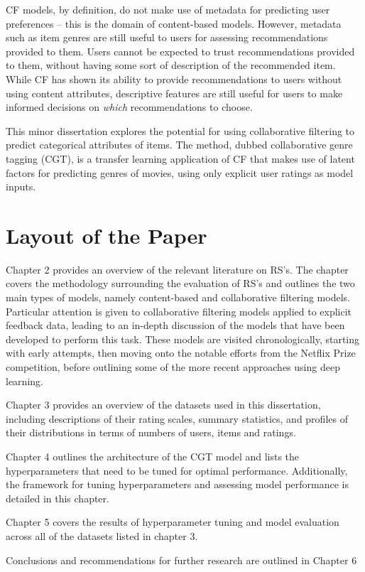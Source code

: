 CF models, by definition, do not make use of metadata for predicting user preferences -- this is the domain of content-based models. However, metadata such as item genres are still useful to users for assessing recommendations provided to them. Users cannot be expected to trust recommendations provided to them, without having some sort of description of the recommended item. While CF has shown its ability to provide recommendations to users without using content attributes, descriptive features are still useful for users to make informed decisions on \textit{which} recommendations to choose.

This minor dissertation explores the potential for using collaborative filtering to predict categorical attributes of items. The method, dubbed collaborative genre tagging (CGT), is a transfer learning application of CF that makes use of latent factors for predicting genres of movies, using only explicit user ratings as model inputs.

\section{Layout of the Paper}
Chapter 2 provides an overview of the relevant literature on RS's. The chapter covers the methodology surrounding the evaluation of RS's and outlines the two main types of models, namely content-based and collaborative filtering models. Particular attention is given to collaborative filtering models applied to explicit feedback data, leading to an in-depth discussion of the models that have been developed to perform this task. These models are visited chronologically, starting with early attempts, then moving onto the notable efforts from the Netflix Prize competition, before outlining some of the more recent approaches using deep learning.

Chapter 3 provides an overview of the datasets used in this dissertation, including descriptions of their rating scales, summary statistics, and profiles of their distributions in terms of numbers of users, items and ratings.

Chapter 4 outlines the architecture of the CGT model and lists the hyperparameters that need to be tuned for optimal performance. Additionally, the framework for tuning hyperparameters and assessing model performance is detailed in this chapter.

Chapter 5 covers the results of hyperparameter tuning and model evaluation across all of the datasets listed in chapter 3.

Conclusions and recommendations for further research are outlined in Chapter 6


 